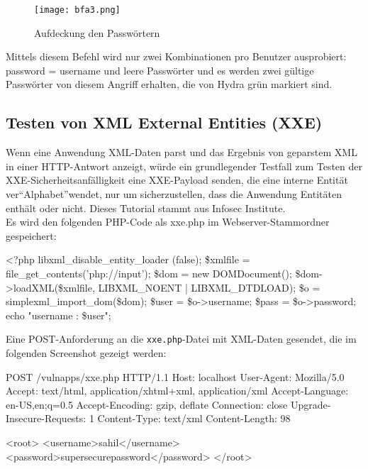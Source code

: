 \begin{figure}[h]
	\centering
	\texttt{[image: bfa3.png]}
	\caption{Aufdeckung den Passwörtern}
\end{figure}

Mittels diesem Befehl wird nur zwei Kombinationen pro Benutzer ausprobiert: password = username und leere Passwörter und es werden zwei gültige Passwörter von diesem Angriff erhalten, die von Hydra grün markiert sind\cite[145]{najera2016kali}.

\subsection{Testen von XML External Entities (XXE)}

Wenn eine Anwendung XML-Daten parst und das Ergebnis von geparstem XML in einer HTTP-Antwort anzeigt, würde ein grundlegender Testfall zum Testen der XXE-Sicherheitsanfälligkeit eine XXE-Payload senden, die eine interne Entität ver"`Alphabet"'wendet, nur um sicherzustellen, dass die Anwendung Entitäten enthält oder nicht. Dieses Tutorial stammt aus Infosec Institute\cite{infosec18}.\\

Es wird den folgenden PHP-Code als xxe.php im Webserver-Stammordner gespeichert:

\newpage

\begin{LaTeXCode}[caption={XXE PHP-Datei},captionpos=b][numbers=none]
<?php
libxml_disable_entity_loader (false);
\$xmlfile = file_get_contents('php://input');
\$dom = new DOMDocument();
\$dom->loadXML(\$xmlfile, LIBXML_NOENT | LIBXML_DTDLOAD);
\$o = simplexml_import_dom(\$dom);
\$user = \$o->username;
\$pass = \$o->password;
echo "username : \$user";\\
\end{LaTeXCode}

Eine POST-Anforderung an die \texttt{xxe.php}-Datei mit XML-Daten gesendet, die im folgenden Screenshot gezeigt werden:

\begin{LaTeXCode}[caption={POST Anfrage zu PHP-Datei},captionpos=b][numbers=none]
POST /vulnapps/xxe.php HTTP/1.1
Host: localhost
User-Agent: Mozilla/5.0
Accept: text/html, application/xhtml+xml, application/xml
Accept-Language: en-US,en;q=0.5
Accept-Encoding: gzip, deflate
Connection: close
Upgrade-Insecure-Requests: 1
Content-Type: text/xml
Content-Length: 98

	<root>
		<username>sahil</username>
		<password>supersecurepassword</password>
	</root>\\
\end{LaTeXCode}

